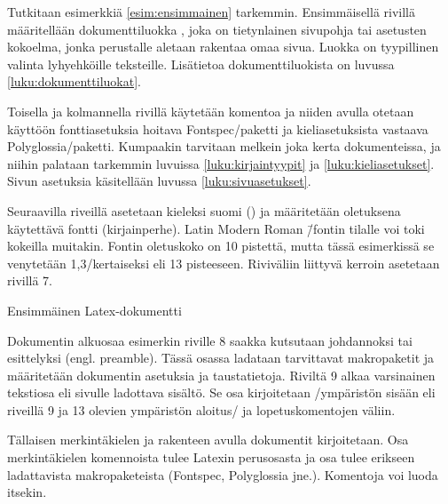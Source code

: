 Tutkitaan esimerkkiä \ref{esim:ensimmainen} tarkemmin. Ensimmäisellä
rivillä määritellään dokumenttiluokka \textenglish{},
joka on tietynlainen sivupohja tai asetusten kokoelma, jonka perustalle
aletaan rakentaa omaa sivua. Luokka \textenglish{} on
tyypillinen valinta lyhyehköille teksteille. Lisätietoa
dokumenttiluokista on luvussa \ref{luku:dokumenttiluokat}.

Toisella ja kolmannella rivillä käytetään komentoa  ja niiden avulla otetaan käyttöön fontti\-asetuksia
hoitava Fontspec\-/paketti ja kieli\-asetuksista vastaava
Polyglossia\-/paketti. Kumpaakin tarvitaan melkein joka kerta
dokumenteissa, ja niihin palataan tarkemmin luvuissa
\ref{luku:kirjaintyypit} ja \ref{luku:kieliasetukset}. Sivun asetuksia
käsitellään luvussa \ref{luku:sivuasetukset}.

Seuraavilla riveillä asetetaan kieleksi suomi () ja
määritetään oletuksena käytettävä fontti (kirjainperhe). Latin Modern
Roman \=/fontin tilalle voi toki kokeilla muitakin. Fontin oletuskoko on
10 pistettä, mutta tässä esimerkissä se venytetään 1,3\-/kertaiseksi eli
13 pisteeseen. Riviväliin liittyvä kerroin asetetaan rivillä 7.

\begin{esimerkki}
\caption{Ensimmäinen Latex-dokumentti}
\label{esim:ensimmainen}
\end{esimerkki}

Dokumentin alku\-osaa esimerkin riville 8 saakka kutsutaan johdannoksi
tai esittelyksi (engl. \textenglish{preamble}). Tässä osassa ladataan
tarvittavat makropaketit ja määritetään dokumentin asetuksia ja
taustatietoja. Riviltä 9 alkaa varsinainen teksti\-osa eli sivulle
ladottava sisältö. Se osa kirjoitetaan \-/ympäristön
sisään eli riveillä 9 ja 13 olevien ympäristön aloitus\-/{} ja
lopetuskomentojen väliin.

Tällaisen merkintäkielen ja rakenteen avulla dokumentit kirjoitetaan.
Osa merkintäkielen komennoista tulee Latexin perus\-osasta ja osa tulee
erikseen ladattavista makropaketeista (Fontspec, Polyglossia jne.).
Komentoja voi luoda itsekin.
